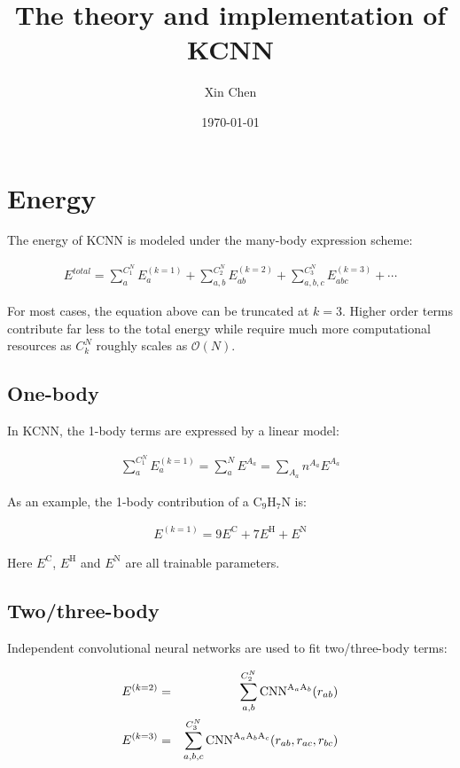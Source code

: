 \documentclass{article}
\title{The theory and implementation of KCNN}
\author{Xin Chen}
\date{\today}
\begin{document}
\maketitle
	

\section{Energy}

The energy of KCNN is modeled under the many-body expression scheme:

\begin{eqnarray}
E^{total} = \sum_{a}^{C^N_1}{E^{(k=1)}_{a}} + \sum_{a,b}^{C^{N}_2}{E^{(k=2)}_{ab}} 
+ \sum_{a,b,c}^{C^{N}_3}{E^{(k=3)}_{abc}} + \cdots
\end{eqnarray}

\noindent For most cases, the equation above can be truncated at $k = 3$. Higher order 
terms contribute far less to the total energy while require much more computational
resources as $C^N_k$ roughly scales as $\mathcal{O}(N)$.

\subsection{One-body}

In KCNN, the 1-body terms are expressed by a linear model:

\begin{eqnarray}
\sum_{a}^{C^N_1}{E^{(k=1)}_{a}} = \sum_{a}^{N}{E^{A_a}} = \sum_{A_{a}}{n^{A_a}E^{A_a}}
\end{eqnarray}

\noindent As an example, the 1-body contribution of a 
$\mathrm{C}_9 \mathrm{H}_7 \mathrm{N}$ is:

\begin{eqnarray}
E^{(k=1)} = 9E^{\mathrm{C}} + 7E^{\mathrm{H}} + E^{\mathrm{N}}
\end{eqnarray}

\noindent Here $E^{\mathrm{C}}$, $E^{\mathrm{H}}$ and $E^{\mathrm{N}}$ are all
trainable parameters.

\subsection{Two/three-body}

Independent convolutional neural networks are used to fit two/three-body terms:

\begin{eqnarray}
E^{(k=2)} & = & \sum_{a,b}^{C^N_2}{
	\boldmath{\mathrm{CNN}}^{\mathrm{A}_{a}\mathrm{A}_{b}}
}(r_{ab}) \\
E^{(k=3)} & = & \sum_{a,b,c}^{C^N_3}{
	\boldmath{\mathrm{CNN}}^{\mathrm{A}_{a}\mathrm{A}_{b}\mathrm{A}_{c}}
}(r_{ab}, r_{ac}, r_{bc})
\end{eqnarray}
\end{document}
